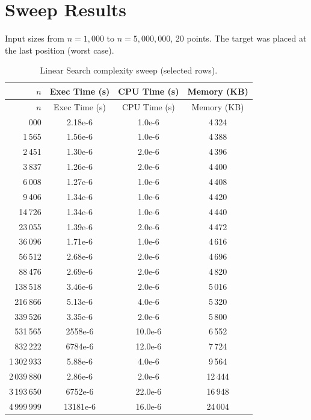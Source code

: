 \documentclass[12pt,a4paper]{report}
\begin{document}
\section{Sweep Results}

Input sizes from $n = 1{,}000$ to $n = 5{,}000{,}000$, 20 points. The target was
placed at the last position (worst case).

\begin{longtable}{rSSS}
\caption{Linear Search complexity sweep (selected rows).}
\label{tab:linear}\\
\toprule
$n$ & {Exec Time (s)} & {CPU Time (s)} & {Memory (KB)} \\
\midrule
\endfirsthead
\toprule
$n$ & {Exec Time (s)} & {CPU Time (s)} & {Memory (KB)} \\
\midrule
\endhead
\bottomrule
{}\,000 & 2.18e-6  & 1.0e-6  &  4\,324 \\
       1\,565 & 1.56e-6  & 1.0e-6  &  4\,388 \\
       2\,451 & 1.30e-6  & 2.0e-6  &  4\,396 \\
       3\,837 & 1.26e-6  & 2.0e-6  &  4\,400 \\
       6\,008 & 1.27e-6  & 1.0e-6  &  4\,408 \\
       9\,406 & 1.34e-6  & 1.0e-6  &  4\,420 \\
      14\,726 & 1.34e-6  & 1.0e-6  &  4\,440 \\
      23\,055 & 1.39e-6  & 2.0e-6  &  4\,472 \\
      36\,096 & 1.71e-6  & 1.0e-6  &  4\,616 \\
      56\,512 & 2.68e-6  & 2.0e-6  &  4\,696 \\
      88\,476 & 2.69e-6  & 2.0e-6  &  4\,820 \\
     138\,518 & 3.46e-6  & 2.0e-6  &  5\,016 \\
     216\,866 & 5.13e-6  & 4.0e-6  &  5\,320 \\
     339\,526 & 3.35e-6  & 2.0e-6  &  5\,800 \\
     531\,565 & 2558e-6  & 10.0e-6 &  6\,552 \\
     832\,222 & 6784e-6  & 12.0e-6 &  7\,724 \\
   1\,302\,933 & 5.88e-6  & 4.0e-6  &  9\,564 \\
   2\,039\,880 & 2.86e-6  & 2.0e-6  & 12\,444 \\
   3\,193\,650 & 6752e-6  & 22.0e-6 & 16\,948 \\
   4\,999\,999 & 13181e-6 & 16.0e-6 & 24\,004 \\
\end{longtable}
\end{document}
